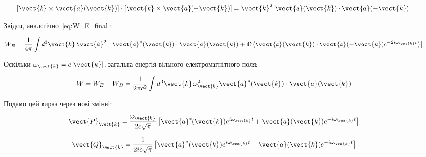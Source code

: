 \begin{equation*}
	\left[ \vect{k} \times \vect{a}(\vect{k}) \right] \cdot \left[ \vect{k} \times \vect{a}(-\vect{k}) \right] = \vect{k}^2\  \vect{a}(\vect{k}) \cdot
	\vect{a}(-\vect{k}).
\end{equation*}

Звідси, аналогічно~\eqref{eq:W_E_final}:

\begin{equation}
	W_B = \frac{1}{4\pi} \int d^3\vect{k} \, \vect{k}^2\  \left[ \vect{a}^*(\vect{k}) \cdot \vect{a}(\vect{k}) + \Re \left( \vect{a}(\vect{k}) \cdot
		\vect{a}(-\vect{k}) e^{-2i\omega_{\vect{k}} t} \right) \right]
	\label{eq:W_B_final}
\end{equation}

Оскільки \(\omega_{\vect{k}} = c|\vect{k}|\), загальна енергія вільного електромагнітного поля:

\begin{equation}
	W = W_E + W_B = \frac{1}{2\pi c^2} \int d^3\vect{k} \, \omega_{\vect{k}}^2 \vect{a}^*(\vect{k}) \cdot \vect{a}(\vect{k})
	\label{eq:total_energy}
\end{equation}

Подамо цей вираз через нові змінні:

\begin{equation}\label{eq:Pk}
	\vect{P}_{\vect{k}} = \frac{\omega_{\vect{k}}}{2c\sqrt{\pi}} \left[ \vect{a}^*(\vect{k}) e^{i\omega_{\vect{k}} t} + \vect{a}(\vect{k})
		e^{-i\omega_{\vect{k}} t} \right]
\end{equation}

\begin{equation}\label{eq:Qk}
	\vect{Q}_{\vect{k}} = \frac{1}{2ic\sqrt{\pi}} \left[ \vect{a}^*(\vect{k}) e^{i\omega_{\vect{k}} t} - \vect{a}(\vect{k}) e^{-i\omega_{\vect{k}} t} \right]
\end{equation}

